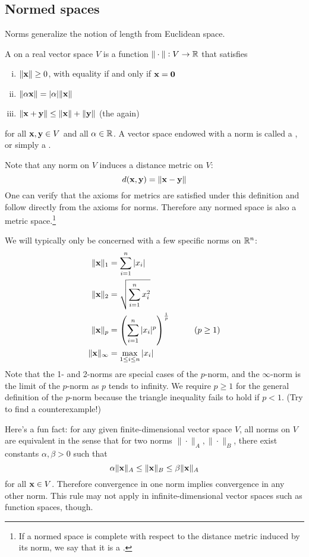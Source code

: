 \subsection{Normed spaces}
Norms generalize the notion of length from Euclidean space.

A  on a real vector space $V$ is a function $\|\cdot\| : V \to \mathbb{R}$ that satisfies
\begin{enumerate}[(i)]
\item $\|\mathbf{x}\| \geq 0$, with equality if and only if $\mathbf{x} = \mathbf{0}$
\item $\|\alpha\mathbf{x}\| = |\alpha|\|\mathbf{x}\|$
\item $\|\mathbf{x}+\mathbf{y}\| \leq \|\mathbf{x}\| + \|\mathbf{y}\|$ (the  again)
\end{enumerate}
for all $\mathbf{x}, \mathbf{y} \in V$ and all $\alpha \in \mathbb{R}$.
A vector space endowed with a norm is called a , or simply a .

Note that any norm on $V$ induces a distance metric on $V$:
\[d(\mathbf{x}, \mathbf{y}) = \|\mathbf{x}-\mathbf{y}\|\]
One can verify that the axioms for metrics are satisfied under this definition and follow directly from the axioms for norms.
Therefore any normed space is also a metric space.\footnote{
    If a normed space is complete with respect to the distance metric induced by its norm, we say that it is a .
}

We will typically only be concerned with a few specific norms on $\mathbb{R}^n$:
\begin{align*}
\|\x\|_1 &= \sum_{i=1}^n |x_i| \\
\|\x\|_2 &= \sqrt{\sum_{i=1}^n x_i^2} \\
\|\x\|_p &= \left(\sum_{i=1}^n |x_i|^p\right)^\frac{1}{p} \tab\tab (p \geq 1) \\
\|\x\|_\infty &= \max_{1 \leq i \leq n} |x_i|
\end{align*}
Note that the 1- and 2-norms are special cases of the $p$-norm, and the $\infty$-norm is the limit of the $p$-norm as $p$ tends to infinity.
We require $p \geq 1$ for the general definition of the $p$-norm because the triangle inequality fails to hold if $p < 1$.
(Try to find a counterexample!)

Here's a fun fact: for any given finite-dimensional vector space $V$, all norms on $V$ are equivalent in the sense that for two norms $\|\cdot\|_A, \|\cdot\|_B$, there exist constants $\alpha, \beta > 0$ such that
\[\alpha\|\mathbf{x}\|_A \leq \|\mathbf{x}\|_B \leq \beta\|\mathbf{x}\|_A\]
for all $\mathbf{x} \in V$. Therefore convergence in one norm implies convergence in any other norm.
This rule may not apply in infinite-dimensional vector spaces such as function spaces, though.

